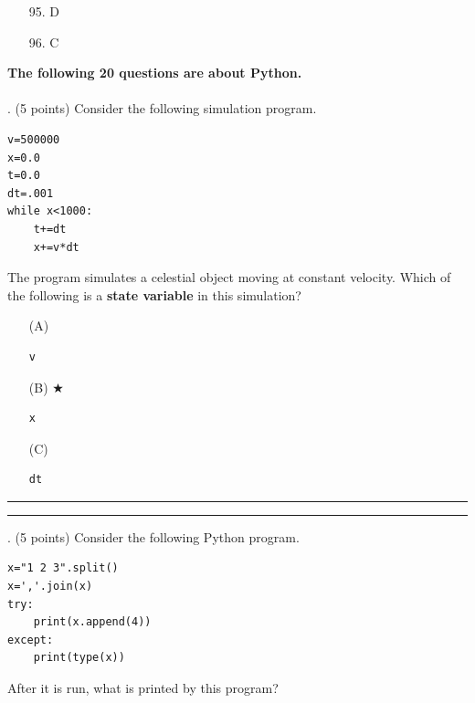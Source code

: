 \documentclass{article}
\newcounter{question}
\begin{document}
\begin{enumerate}
\item[95.] D
\item[96.] C
\end{enumerate}

\newpage


\pagebreak \noindent \textbf{The following 20 questions are about Python.}
\\\\





\newpage
{}. (5 points)
Consider the following simulation program.
\begin{verbatim}
v=500000
x=0.0
t=0.0
dt=.001
while x<1000:
    t+=dt
    x+=v*dt
\end{verbatim}
The program simulates a celestial object moving at constant velocity. Which of the following is a \textbf{state variable} in this simulation?


\begin{enumerate}
\item[(A)]
\begin{verbatim}v\end{verbatim}

\item[(B)] $\bigstar$ 
\begin{verbatim}x\end{verbatim}

\item[(C)]
\begin{verbatim}dt\end{verbatim}

\end{enumerate}

\vspace*{2em}
\hrule
\vspace{2em}

\vspace{2em}
\hrule height 2pt


\newpage
{}. (5 points)
Consider the following Python program.
\begin{verbatim}
x="1 2 3".split()
x=','.join(x)
try:
    print(x.append(4))
except:
    print(type(x))
\end{verbatim}
After it is run, what is printed by this program?
\end{document}
